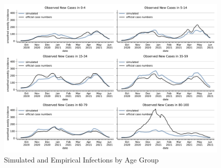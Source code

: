 \begin{figure}[ht]
  \centering
  \includegraphics[width=\textwidth]{../figures/results/figures/incidences_by_group/age_group_rki/full_combined_baseline_new_known_case}
  \caption{Simulated and Empirical Infections by Age Group}
  \label{fig:age_group_fit}
\end{figure}


